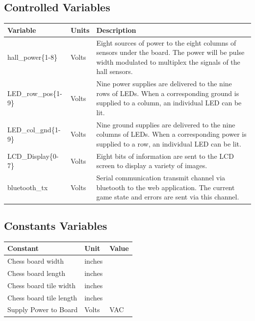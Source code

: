 \documentclass[12pt, titlepage]{article}
\begin{document}
\subsection{Controlled Variables}
\begin{table}[H]
  \centering
      \setlength{\leftmargini}{0.4cm}
      \begin{tabular}{| >{\centering\arraybackslash}m{3cm} | 
        >{\centering\arraybackslash}m{2cm} | 
        >{\centering\arraybackslash}m{9cm} |}
      \hline
      \rowcolor[gray]{0.9}
      Variable & Units & Description\\
      \hline 
      hall\_power\{1-8\} & Volts & Eight sources of power to the eight columns of sensors under the board. 
      The power will be pulse width modulated to multiplex the signals of the hall sensors.\\
      \hline 
      LED\_row\_pos\{1-9\} & Volts & Nine power supplies are delivered to the nine rows of LEDs. When a 
      corresponding ground is supplied to a column, an individual LED can be lit.\\
      \hline
      LED\_col\_gnd\{1-9\} & Volts & Nine ground supplies are delivered to the nine columns of LEDs. When a 
      corresponding power is supplied to a row, an individual LED can be lit.\\
      \hline 
      LCD\_Display\{0-7\} & Volts & Eight bits of information are sent to the LCD screen to display a variety
      of images. \\
      \hline 
      bluetooth\_tx & Volts & Serial communication transmit channel via bluetooth to the web application. 
      The current game state and errors are sent via this channel. \\
      \hline
      \end{tabular}
  \label{Table}
  \end{table}

\subsection{Constants Variables}
\begin{table}[H]
  \centering
      \setlength{\leftmargini}{0.4cm}
      \begin{tabular}{| >{\centering\arraybackslash}m{5cm} | 
        >{\centering\arraybackslash}m{2cm} | 
        >{\centering\arraybackslash}m{5cm} |}
      \hline
      \rowcolor[gray]{0.9}
      Constant & Unit & Value\\
      \hline
      Chess board width & inches & 12\\
     \hline
     Chess board length & inches & 12\\
     \hline
     Chess board tile width & inches & 1.5\\
     \hline 
     Chess board tile length & inches & 1.5\\ 
     \hline 
     Supply Power to Board & Volts & 110 VAC\\
     \hline
      \end{tabular}
  \label{Table}
  \end{table}
\end{document}

